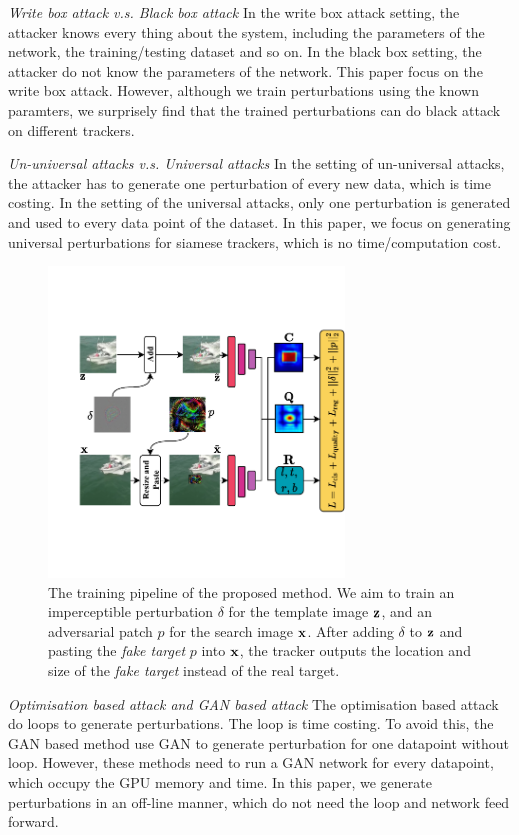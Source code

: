 \documentclass[journal]{IEEEtran}
\begin{document}
\textit{Write box attack v.s. Black box attack} In the write box attack setting, the attacker knows every thing about the system, including the parameters of the network, the training/testing dataset and so on. In the black box setting, the attacker do not know the parameters of the network. This paper focus on the write box attack. However, although we train perturbations using the known paramters, we surprisely find that the trained perturbations can do black attack on different trackers.

\textit{Un-universal attacks v.s. Universal attacks} In the setting of un-universal attacks, the attacker has to generate one perturbation of every new data, which is time costing. In the setting of the universal attacks, only one perturbation is generated and used to every data point of the dataset. In this paper, we focus on generating universal perturbations for siamese trackers, which is no time/computation cost.

\begin{figure}[t]
  \centering
  \includegraphics[width=0.7\textwidth]{images/network_v5.pdf}
  \caption{The training pipeline of the proposed method. We aim to train an imperceptible perturbation $\delta$ for the template image $\textbf z$, and an adversarial patch $p$ for the search image $\textbf x$. After adding $\delta$ to $\textbf z$ and pasting the \textit{fake target} $p$ into $\textbf x$, the tracker outputs the location and size of the \textit{fake target} instead of the real target.}
  \label{fig:net}
\end{figure}

\textit{Optimisation based attack and GAN based attack} The optimisation based attack do loops to generate perturbations. The loop is time costing. To avoid this, the GAN based method use GAN to generate perturbation for one datapoint without loop. However, these methods need to run a GAN network for every datapoint, which occupy the GPU memory and time. In this paper, we generate perturbations in an off-line manner, which do not need the loop and network feed forward.
\end{document}
